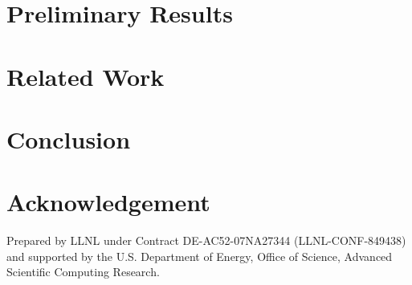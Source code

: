 \documentclass[runningheads]{llncs}
\begin{document}
% 


\section{Preliminary Results} %
\label{sec-evaluation}



\section{Related Work} %

\label{sec-related-work}

\section{Conclusion} %

\label{sec-conclusion}

\section*{Acknowledgement}
Prepared by LLNL under Contract DE-AC52-07NA27344 (LLNL-CONF-849438) and supported by the U.S. Department of Energy, Office of Science, Advanced Scientific Computing Research.




\end{document}
